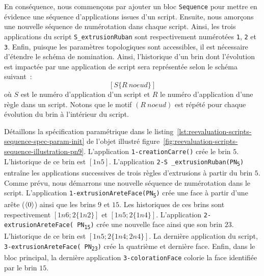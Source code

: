 En conséquence, nous commençons par ajouter un bloc \texttt{Sequence} pour
mettre en évidence une séquence d'applications issues d'un script. %
Ensuite, nous amorçons une nouvelle séquence de numérotation dans chaque
script. %
Ainsi, les trois applications du script \texttt{S\_extrusionRuban} sont
respectivement numérotées \texttt{1}, \texttt{2} et \texttt{3}. %
Enfin, puisque les paramètres topologiques sont accessibles, il est nécessaire
d'étendre le schéma de nomination. %
Ainsi, l'historique d'un brin dont l'évolution est impactée par une
application de script sera représentée selon le schéma suivant~: %
\[[\mathit{S\{R~noeud\}}]\] %
où \(S\) est le numéro d'application d'un script et \(R\) le numéro
d'application d'une règle dans un script. %
Notons que le motif \((R~noeud)\) est répété pour chaque évolution du brin à l'intérieur du script. %

Détaillons la spécification paramétrique dans le
listing~\ref{lst:reevaluation-scripts-sequence-spec-param-init} de l'objet
illustré figure~\ref{fig:reevaluation-scripts-sequence-illustration-pn9}. %
L'application \texttt{1\allowbreak{}-\allowbreak{}creation\-Carre()} crée le
brin \(5\). %
L'historique de ce brin est \([1n5]\). %
L'application \texttt{2\allowbreak{}\allowbreak{}-S\allowbreak{}%
	\_\allowbreak{}extrusion\-Ruban(PN\textsubscript{5})} entraîne les
applications successives de trois règles d'extrusions à partir du brin \(5\). %
Comme prévu, nous démarrons une nouvelle séquence de numérotation dans le
script. %
L'application
\texttt{1\allowbreak{}-\allowbreak{}extrusion\-Arete\-Face(PN\textsubscript{5})}
crée une face à partir d'une arête (\(\langle0\rangle\)) ainsi que les brins \(9\) et
\(15\). %
Les historiques de ces brins sont respectivement \([1n6;2\{1n2\}]\) et
\([1n5;2\{1n4\}]\). %
L'application \texttt{2\allowbreak{}-\allowbreak{}extrusion\-Arete\-Face(%
	PN\textsubscript{15})} crée une nouvelle face ainsi que son brin \(23\). %
L'historique de ce brin est \([1n5;2\{1n4;2n4\}]\). %
La dernière application du script,
\texttt{3\allowbreak{}-\allowbreak{}extrusion\-Arete\-Face(%
	PN\textsubscript{23})} crée la quatrième et dernière face. %
Enfin, dans le bloc principal, la dernière application
\texttt{3\allowbreak{}-\allowbreak{}coloration\-Face} colorie la face identifiée
par le brin \(15\). %


